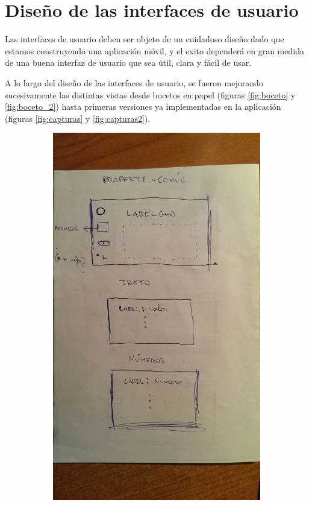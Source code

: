 \bigskip
\section{Diseño de las interfaces de usuario}

Las interfaces de usuario deben ser objeto de un cuidadoso diseño dado que estamos construyendo una aplicación móvil, y el exito dependerá en gran medida de una buena interfaz de usuario que sea útil, clara y fácil de usar.

\bigskip
A lo largo del diseño de las interfaces de usuario, se fueron mejorando sucesivamente las distintas vistas desde bocetos en papel (figuras \ref{fig:boceto} y \ref{fig:boceto_2}) hasta primeras versiones ya implementadas en la aplicación (figuras \ref{fig:capturas} y \ref{fig:capturas2}).


\begin{figure}
    \centering
    \begin{subfigure}[]{0.4\textwidth}
        \includegraphics[width=\textwidth]{../images/boceto.jpg}

\end{subfigure}
\end{figure}
